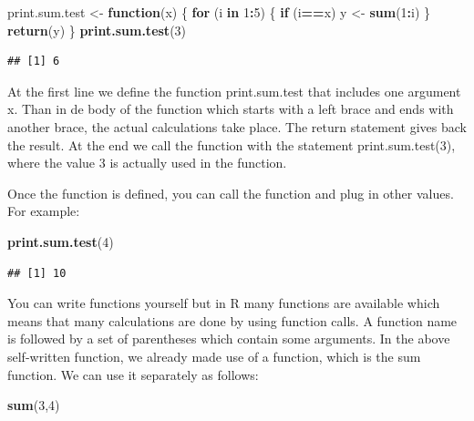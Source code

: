\documentclass[]{book}
\newenvironment{Shaded}{\begin{snugshade}}{\end{snugshade}}
\newcommand{\KeywordTok}[1]{\textcolor[rgb]{0.13,0.29,0.53}{\textbf{#1}}}
\newcommand{\DecValTok}[1]{\textcolor[rgb]{0.00,0.00,0.81}{#1}}
\newcommand{\StringTok}[1]{\textcolor[rgb]{0.31,0.60,0.02}{#1}}
\newcommand{\ControlFlowTok}[1]{\textcolor[rgb]{0.13,0.29,0.53}{\textbf{#1}}}
\newcommand{\OperatorTok}[1]{\textcolor[rgb]{0.81,0.36,0.00}{\textbf{#1}}}
\newcommand{\NormalTok}[1]{#1}
\begin{document}
\begin{Shaded}
\begin{Highlighting}[]
\NormalTok{print.sum.test <-}\StringTok{ }\ControlFlowTok{function}\NormalTok{(x) }
\NormalTok{\{}
 \ControlFlowTok{for}\NormalTok{ (i }\ControlFlowTok{in} \DecValTok{1}\OperatorTok{:}\DecValTok{5}\NormalTok{) }
\NormalTok{ \{}
   \ControlFlowTok{if}\NormalTok{ (i}\OperatorTok{==}\NormalTok{x) y <-}\StringTok{ }\KeywordTok{sum}\NormalTok{(}\DecValTok{1}\OperatorTok{:}\NormalTok{i)  }
\NormalTok{ \}}
\KeywordTok{return}\NormalTok{(y)}
\NormalTok{\}}
\KeywordTok{print.sum.test}\NormalTok{(}\DecValTok{3}\NormalTok{)}
\end{Highlighting}
\end{Shaded}

\begin{verbatim}
## [1] 6
\end{verbatim}

At the first line we define the function print.sum.test that includes
one argument x. Than in de body of the function which starts with a left
brace and ends with another brace, the actual calculations take place.
The return statement gives back the result. At the end we call the
function with the statement print.sum.test(3), where the value 3 is
actually used in the function.

Once the function is defined, you can call the function and plug in
other values. For example:

\begin{Shaded}
\begin{Highlighting}[]
\KeywordTok{print.sum.test}\NormalTok{(}\DecValTok{4}\NormalTok{)}
\end{Highlighting}
\end{Shaded}

\begin{verbatim}
## [1] 10
\end{verbatim}

You can write functions yourself but in R many functions are available
which means that many calculations are done by using function calls. A
function name is followed by a set of parentheses which contain some
arguments. In the above self-written function, we already made use of a
function, which is the sum function. We can use it separately as
follows:

\begin{Shaded}
\begin{Highlighting}[]
\KeywordTok{sum}\NormalTok{(}\DecValTok{3}\NormalTok{,}\DecValTok{4}\NormalTok{)}
\end{Highlighting}
\end{Shaded}
\end{document}
